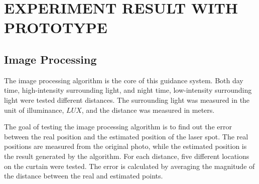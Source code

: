 \chapter{EXPERIMENT RESULT WITH PROTOTYPE}



\section{Image Processing}
The image processing algorithm is the core of this guidance system. Both day time, high-intensity surrounding light, and night time, low-intensity surrounding light were tested different distances. The surrounding light was measured in the unit of illuminance, $LUX$, and the distance was measured in meters.%

The goal of testing the image processing algorithm is to find out the error between the real position and the estimated position of the laser spot. The real positions are measured from the original photo, while the estimated position is the result generated by the algorithm. For each distance, five different locations on the curtain were tested. The error is calculated by averaging the magnitude of the distance between the real and estimated points. 

